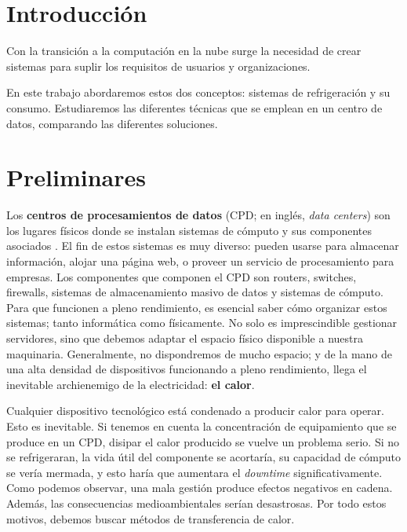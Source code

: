 


\chapter{Introducción}

Con la transición a la computación en la nube surge la necesidad de crear sistemas para suplir los requisitos de usuarios y organizaciones. 

En este trabajo abordaremos estos dos conceptos: sistemas de refrigeración y su consumo. Estudiaremos las diferentes técnicas que se emplean en un centro de datos, comparando las diferentes soluciones.

\chapter{Preliminares}

Los \textbf{centros de procesamientos de datos} (CPD; en inglés, \textit{data centers}) son los lugares físicos donde se instalan sistemas de cómputo y sus componentes asociados \cite{wikipedia-datacenter}. El fin de estos sistemas es muy diverso: pueden usarse para almacenar información, alojar una página web, o proveer un servicio de procesamiento para empresas. Los componentes que componen el CPD son routers, switches, firewalls, sistemas de almacenamiento masivo de datos y sistemas de cómputo. Para que funcionen a pleno rendimiento, es esencial saber cómo organizar estos sistemas; tanto informática como físicamente. No solo es imprescindible gestionar servidores, sino que debemos adaptar el espacio físico disponible a nuestra maquinaria. Generalmente, no dispondremos de mucho espacio; y de la mano de una alta densidad de dispositivos funcionando a pleno rendimiento, llega el inevitable archienemigo de la electricidad: \textbf{el calor}.

Cualquier dispositivo tecnológico está condenado a producir calor para operar. Esto es inevitable. Si tenemos en cuenta la concentración de equipamiento que se produce en un CPD, disipar el calor producido se vuelve un problema serio. Si no se refrigeraran, la vida útil del componente se acortaría, su capacidad de cómputo se vería mermada, y esto haría que aumentara el \textit{downtime} significativamente. Como podemos observar, una mala gestión produce efectos negativos en cadena. Además, las consecuencias medioambientales serían desastrosas. Por todo estos motivos, debemos buscar métodos de transferencia de calor.

